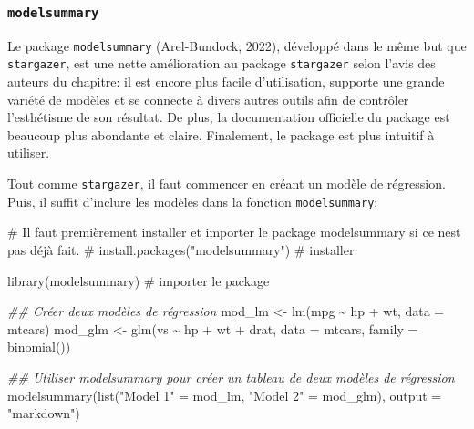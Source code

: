 \documentclass[
  letterpaper,
  DIV=11,
  numbers=noendperiod]{scrreprt}
\newenvironment{Shaded}{\begin{snugshade}}{\end{snugshade}}
\newcommand{\AttributeTok}[1]{\textcolor[rgb]{0.40,0.45,0.13}{#1}}
\newcommand{\CommentTok}[1]{\textcolor[rgb]{0.37,0.37,0.37}{#1}}
\newcommand{\DocumentationTok}[1]{\textcolor[rgb]{0.37,0.37,0.37}{\textit{#1}}}
\newcommand{\FunctionTok}[1]{\textcolor[rgb]{0.28,0.35,0.67}{#1}}
\newcommand{\NormalTok}[1]{\textcolor[rgb]{0.00,0.23,0.31}{#1}}
\newcommand{\OtherTok}[1]{\textcolor[rgb]{0.00,0.23,0.31}{#1}}
\newcommand{\SpecialCharTok}[1]{\textcolor[rgb]{0.37,0.37,0.37}{#1}}
\newcommand{\StringTok}[1]{\textcolor[rgb]{0.13,0.47,0.30}{#1}}
\begin{document}
\hypertarget{sec-model-summary}{%
\subsubsection{\texorpdfstring{\texttt{modelsummary}}{modelsummary}}\label{sec-model-summary}}

Le package \texttt{modelsummary} (Arel-Bundock, 2022), développé dans le
même but que \texttt{stargazer}, est une nette amélioration au package
\texttt{stargazer} selon l'avis des auteurs du chapitre: il est encore
plus facile d'utilisation, supporte une grande variété de modèles et se
connecte à divers autres outils afin de contrôler l'esthétisme de son
résultat. De plus, la documentation officielle du package est beaucoup
plus abondante et claire. Finalement, le package est plus intuitif à
utiliser.

Tout comme \texttt{stargazer}, il faut commencer en créant un modèle de
régression. Puis, il suffit d'inclure les modèles dans la fonction
\texttt{modelsummary}:

\begin{Shaded}
\begin{Highlighting}[]
\CommentTok{\# Il faut premièrement installer et importer le package modelsummary si ce n\textquotesingle{}est pas déjà fait.}
\CommentTok{\# install.packages("modelsummary") \# installer}

\FunctionTok{library}\NormalTok{(modelsummary) }\CommentTok{\# importer le package}
\end{Highlighting}
\end{Shaded}

\begin{Shaded}
\begin{Highlighting}[]
\DocumentationTok{\#\# Créer deux modèles de régression}
\NormalTok{mod\_lm }\OtherTok{\textless{}{-}} \FunctionTok{lm}\NormalTok{(mpg }\SpecialCharTok{\textasciitilde{}}\NormalTok{ hp }\SpecialCharTok{+}\NormalTok{ wt, }\AttributeTok{data =}\NormalTok{ mtcars)}
\NormalTok{mod\_glm }\OtherTok{\textless{}{-}} \FunctionTok{glm}\NormalTok{(vs }\SpecialCharTok{\textasciitilde{}}\NormalTok{ hp }\SpecialCharTok{+}\NormalTok{ wt }\SpecialCharTok{+}\NormalTok{ drat, }\AttributeTok{data =}\NormalTok{ mtcars, }\AttributeTok{family =} \FunctionTok{binomial}\NormalTok{())}

\DocumentationTok{\#\# Utiliser modelsummary pour créer un tableau de deux modèles de régression}
\FunctionTok{modelsummary}\NormalTok{(}\FunctionTok{list}\NormalTok{(}\StringTok{"Model 1"} \OtherTok{=}\NormalTok{ mod\_lm, }\StringTok{"Model 2"} \OtherTok{=}\NormalTok{ mod\_glm), }\AttributeTok{output =} \StringTok{"markdown"}\NormalTok{)}
\end{Highlighting}
\end{Shaded}
\end{document}
